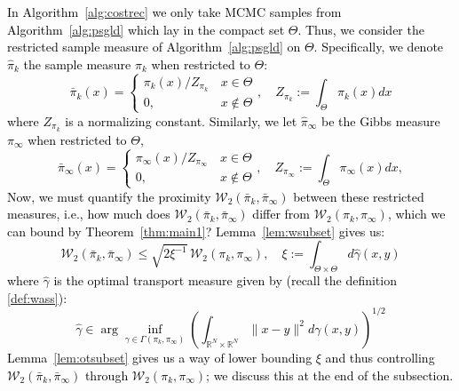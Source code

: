 \documentclass[journal,onecolumn]{IEEEtran}
\newcommand{\rew}{J}
\newcommand{\reals}{\mathbb{R}}
\newcommand{\dimn}{N}
\newcommand{\wass}{\mathcal{W}_2}
\newcommand{\gibbs}{\ids_{\infty}}
\newcommand{\dtlaw}{\ids_{k}} %
\newcommand{\LSconst}{c_{LS}}
\newcommand{\ids}{\pi}
\newcommand{\idw}{\gamma}
\newcommand{\ksp}{k,\idw}
\newcommand{\zconst}{\xi}
\begin{document}


\textcolor{black}{In Algorithm~\ref{alg:costrec} we only take MCMC samples from Algorithm~\ref{alg:psgld} which lay in the compact set $\Theta$. Thus, we consider the restricted sample measure of Algorithm~\ref{alg:psgld} on $\Theta$. Specifically, we denote $\hat{\pi}_k$ the sample measure $\dtlaw$ when restricted to $\Theta$:
\[\bar{\pi}_k(x) = \begin{cases} \dtlaw(x)/Z_{\dtlaw} \, &x\in \Theta \\ 0, &x\notin \Theta \end{cases}, \quad Z_{\dtlaw} := \int_{\Theta}\dtlaw(x)dx\]
where $Z_{\dtlaw}$ is a normalizing constant. Similarly, we let $\hat{\pi}_{\infty}$ be the Gibbs measure $\gibbs$ when restricted to $\Theta$,
\begin{equation}
\label{eq:gibbsrest}
\bar{\pi}_{\infty}(x) = \begin{cases} \gibbs(x)/Z_{\gibbs} \, &x\in \Theta \\ 0, &x\notin \Theta \end{cases},\quad Z_{\gibbs} := \int_{\Theta}\gibbs(x)dx,
\end{equation}
Now, we must quantify the proximity $\wass(\bar{\pi}_k,\bar{\pi}_{\infty})$ between these restricted measures, i.e., how much does $\wass(\bar{\pi}_k,\bar{\pi}_{\infty})$ differ from $\wass(\dtlaw,\gibbs)$, which we can bound by Theorem~\ref{thm:main1}? Lemma~\ref{lem:wsubset} gives us:
\begin{equation}
\label{eq:Zint}
\wass(\bar{\pi}_k,\bar{\pi}_{\infty}) \leq \sqrt{2 \zconst^{-1}}\,\wass(\dtlaw,\gibbs), \quad  \zconst:= \int_{\Theta \times \Theta}d\hat{\gamma}(x,y)
\end{equation} where $\hat{\gamma}$ is the optimal transport measure given by (recall the definition \eqref{def:wass}): \[\hat{\gamma} \in \arg\inf_{\gamma\in\Gamma(\dtlaw,\gibbs)}\left(\int_{\reals^{\dimn} \times \reals^{\dimn}} \|x-y\|^2d\gamma(x,y)\right)^{1/2}\]
Lemma~\ref{lem:otsubset} gives us a way of lower bounding $\zconst$ and thus controlling $\wass(\bar{\pi}_k,\bar{\pi}_{\infty})$ through $\wass(\dtlaw,\gibbs)$; we discuss this at the end of the subsection.}
\end{document}
